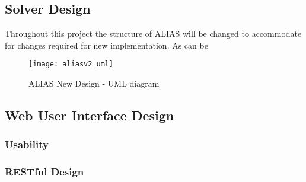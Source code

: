 \subsection{Solver Design}
Throughout this project the structure of ALIAS will be changed to accommodate for changes required for new implementation. As can be 

\begin{figure}[h]
	\texttt{[image: aliasv2\_uml]}
	\caption{ALIAS New Design - UML diagram}
	\label{fig:aliasUml2}
\end{figure}


\subsection{Web User Interface Design}

\subsubsection{Usability}

\subsubsection{RESTful Design}